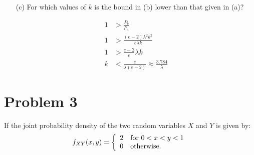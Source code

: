 \documentclass{article}
\newcommand{\1}{\mathbf{1}}
\begin{document}
\begin{enumerate}
    \item[(c)] For which values of $k$ is the bound in (b) lower than that given in (a)?
    
    \begin{align*}
        1 &> \frac{P_b}{P_a}\\
        1 &>\frac{(e-2)\lambda^2 k^2}{e\lambda k} \\ %
        1 &> \frac{e-2}{e}\lambda k \\
        k &< \frac{e}{\lambda (e-2)} \approx \frac{3.784}{\lambda}
    \end{align*}
\end{enumerate}



\newpage
\section*{Problem 3} 
If the joint probability density of the two random variables $X$ and $Y$ is given by:
$$ f_{XY}(x,y) =\left\{
    \begin{array}{ll}
        2 & \hbox{for } 0 < x < y <1 \\
        0 & \hbox{otherwise.}
    \end{array}
\right.$$
\end{document}
